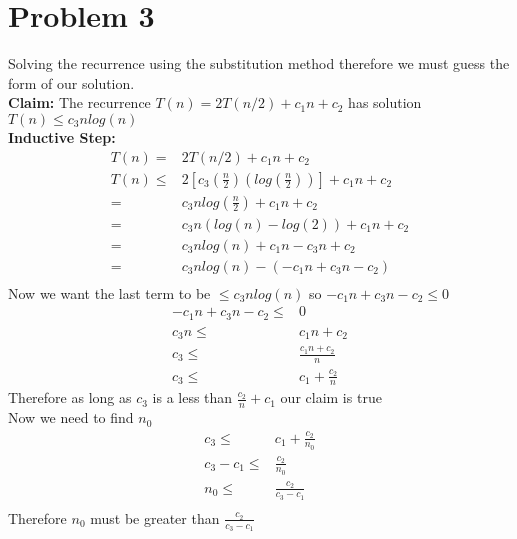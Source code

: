 \documentclass[11pt]{article}
\begin{document}
	\section*{Problem 3}
		Solving the recurrence using the substitution method therefore we must guess the form of our solution.
		\\
		\textbf{Claim:} The recurrence $T(n)=2T(n/2)+c_1n + c_2$ has solution $T(n)\le c_3 nlog(n)$\\
		\textbf{Inductive Step:}\\
		\begin{align}
			T(n)=&2T(n/2)+c_1n + c_2\\
			T(n)\le& 2[c_3(\frac{n}{2})(log(\frac{n}{2}))] +c_1n+c_2\\
			=& c_3nlog(\frac{n}{2})+c_1n+c_2\\
			=& c_3 n(log(n)-log(2))+c_1n+c_2\\
			=& c_3 nlog(n)+c_1n-c_3 n+c_2\\
			=& c_3 nlog(n)-(-c_1n+c_3 n-c_2)\\
		\end{align}
		Now we want the last term to be $\le c_3 nlog(n)$ so $-c_1n+c_3 n-c_2\le 0$
		\begin{align}
			-c_1n+c_3 n-c_2\le& 0\\
			c_3 n\le& c_1n+c_2\\
			c_3 \le&\frac{c_1n+c_2}{n}\\
			c_3 \le& c_1 +\frac{c_2}{n}
		\end{align}
		Therefore as long as $c_3$ is a less than $\frac{c_2}{n} + c_1$ our claim is true
		\\
		Now we need to find $n_0$\\
		\begin{align}
			c_3 \le& c_1 +\frac{c_2}{n_0}\\
			c_3 -c_1 \le&\frac{c_2}{n_0}\\
			n_0\le& \frac{c_2}{c_3 -c_1}\\
		\end{align}
		Therefore $n_0$ must be greater than $\frac{c_2}{c_3 -c_1}$
\end{document}
